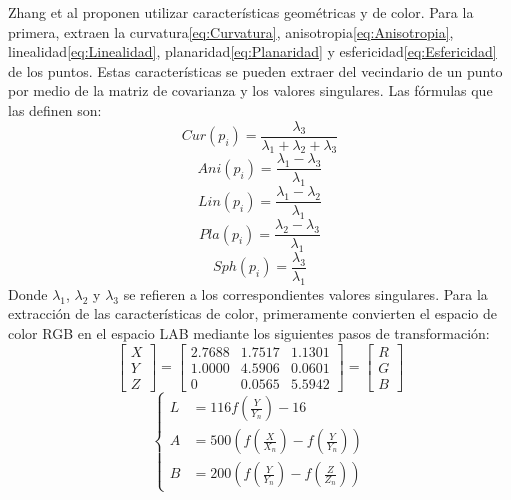 Zhang et al\cite{NR3DQA} proponen utilizar características geométricas y de 
color. Para la primera, extraen la curvatura\eqref{eq:Curvatura}, 
anisotropia\eqref{eq:Anisotropia}, linealidad\eqref{eq:Linealidad}, 
planaridad\eqref{eq:Planaridad} y esfericidad\eqref{eq:Esfericidad} de los puntos. 
Estas características se pueden extraer del vecindario 
de un punto por medio de la matriz de covarianza y los valores singulares. 
Las fórmulas que las definen son: 
\begin{equation}
  Cur(p_i) = \frac{\lambda_3}{\lambda_1 + \lambda_2 + \lambda_3}
  \label{eq:Curvatura}
\end{equation}
\begin{equation}
  Ani(p_i) = \frac{\lambda_1 - \lambda_3}{\lambda_1}
  \label{eq:Anisotropia}
\end{equation}
\begin{equation}
  Lin(p_i) = \frac{\lambda_1 - \lambda_2}{\lambda_1}
  \label{eq:Linealidad}
\end{equation}
\begin{equation}
  Pla(p_i) = \frac{\lambda_2 - \lambda_3}{\lambda_1}
  \label{eq:Planaridad}
\end{equation}
\begin{equation}
  Sph(p_i) = \frac{\lambda_3}{\lambda_1}
  \label{eq:Esfericidad}
\end{equation}
Donde $\lambda_1$, $\lambda_2$ y $\lambda_3$ se refieren a los correspondientes 
valores singulares. Para la extracción de las características de color, primeramente 
convierten el espacio de color RGB en el espacio LAB mediante los siguientes 
pasos de transformación: 
\begin{equation}
  \begin{bmatrix} 
    X \\ Y \\ Z 
  \end{bmatrix}  = 
  \begin{bmatrix}
    2.7688 & 1.7517 & 1.1301 \\ 
    1.0000 & 4.5906 & 0.0601 \\ 
    0 & 0.0565 & 5.5942 
  \end{bmatrix} = 
  \begin{bmatrix}
    R \\ G \\ B 
  \end{bmatrix} 
  \label{eq:ScaleXYZ}
\end{equation}
\begin{equation}
\begin{cases}
  L &= 116f\left(\frac{Y}{Y_n}\right) - 16 \\ 
  A &= 500\left( f\left(\frac{X}{X_n}\right) - f\left(\frac{Y}{Y_n}\right) \right) \\ 
  B &= 200\left( f\left(\frac{Y}{Y_n}\right) - f\left(\frac{Z}{Z_n}\right)\right) 
\end{cases}
  \label{eq:LABTransform}
\end{equation}
